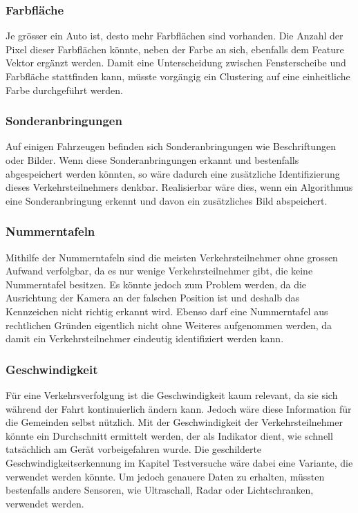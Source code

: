 \subsubsection{Farbfläche}
Je grösser ein Auto ist, desto mehr Farbflächen sind vorhanden. Die Anzahl der Pixel dieser Farbflächen könnte, neben der Farbe an sich, ebenfalls dem Feature Vektor ergänzt werden. Damit eine Unterscheidung zwischen Fensterscheibe und Farbfläche stattfinden kann, müsste vorgängig ein Clustering auf eine einheitliche Farbe durchgeführt werden.

\subsubsection{Sonderanbringungen}
Auf einigen Fahrzeugen befinden sich Sonderanbringungen wie Beschriftungen oder Bilder. Wenn diese Sonderanbringungen erkannt und bestenfalls abgespeichert werden könnten, so wäre dadurch eine zusätzliche Identifizierung dieses Verkehrsteilnehmers denkbar. Realisierbar wäre dies, wenn ein Algorithmus eine Sonderanbringung erkennt und davon ein zusätzliches Bild abspeichert.

\subsubsection{Nummerntafeln}
Mithilfe der Nummerntafeln sind die meisten Verkehrsteilnehmer ohne grossen Aufwand verfolgbar, da es nur wenige Verkehrsteilnehmer gibt, die keine Nummerntafel besitzen. Es könnte jedoch zum Problem werden, da die Ausrichtung der Kamera an der falschen Position ist und deshalb das Kennzeichen nicht richtig erkannt wird. Ebenso darf eine Nummerntafel aus rechtlichen Gründen eigentlich nicht ohne Weiteres aufgenommen werden, da damit ein Verkehrsteilnehmer eindeutig identifiziert werden kann.

\subsubsection{Geschwindigkeit}
Für eine Verkehrsverfolgung ist die Geschwindigkeit kaum relevant, da sie sich während der Fahrt kontinuierlich ändern kann. Jedoch wäre diese Information für die Gemeinden selbst nützlich. Mit der Geschwindigkeit der Verkehrsteilnehmer könnte ein Durchschnitt ermittelt werden, der als Indikator dient, wie schnell tatsächlich am Gerät vorbeigefahren wurde. Die geschilderte Geschwindigkeitserkennung im Kapitel Testversuche wäre dabei eine Variante, die verwendet werden könnte. Um jedoch genauere Daten zu erhalten, müssten bestenfalls andere Sensoren, wie Ultraschall, Radar oder Lichtschranken, verwendet werden.